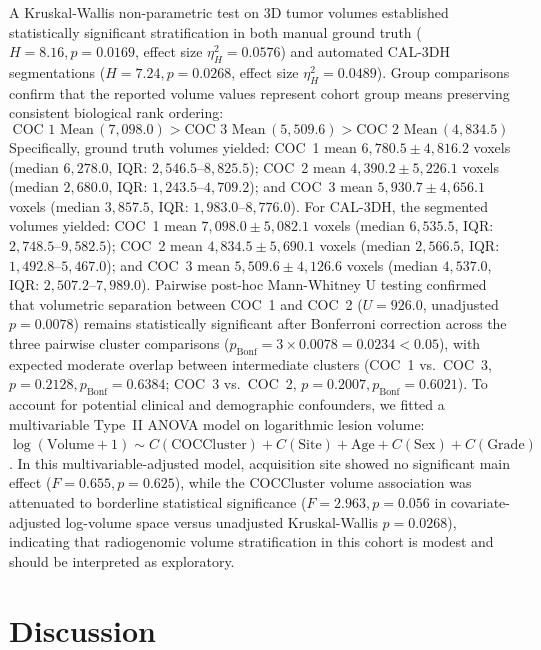 \documentclass[11pt,a4paper]{article}
\begin{document}
A Kruskal-Wallis non-parametric test on 3D tumor volumes established statistically significant stratification in both manual ground truth ($H = 8.16, p = \mathbf{0.0169}$, effect size $\eta^2_H = 0.0576$) and automated CAL-3DH segmentations ($H = 7.24, p = \mathbf{0.0268}$, effect size $\eta^2_H = 0.0489$). Group comparisons confirm that the reported volume values represent cohort group means preserving consistent biological rank ordering:
\begin{equation}
\text{COC 1 Mean}\,(7{,}098.0) > \text{COC 3 Mean}\,(5{,}509.6) > \text{COC 2 Mean}\,(4{,}834.5)
\end{equation}
Specifically, ground truth volumes yielded: COC~1 mean $6{,}780.5 \pm 4{,}816.2$ voxels (median $6{,}278.0$, IQR: $2{,}546.5$--$8{,}825.5$); COC~2 mean $4{,}390.2 \pm 5{,}226.1$ voxels (median $2{,}680.0$, IQR: $1{,}243.5$--$4{,}709.2$); and COC~3 mean $5{,}930.7 \pm 4{,}656.1$ voxels (median $3{,}857.5$, IQR: $1{,}983.0$--$8{,}776.0$). For CAL-3DH, the segmented volumes yielded: COC~1 mean $7{,}098.0 \pm 5{,}082.1$ voxels (median $6{,}535.5$, IQR: $2{,}748.5$--$9{,}582.5$); COC~2 mean $4{,}834.5 \pm 5{,}690.1$ voxels (median $2{,}566.5$, IQR: $1{,}492.8$--$5{,}467.0$); and COC~3 mean $5{,}509.6 \pm 4{,}126.6$ voxels (median $4{,}537.0$, IQR: $2{,}507.2$--$7{,}989.0$). Pairwise post-hoc Mann-Whitney U testing confirmed that volumetric separation between COC~1 and COC~2 ($U = 926.0$, unadjusted $p = 0.0078$) remains statistically significant after Bonferroni correction across the three pairwise cluster comparisons ($p_{\text{Bonf}} = 3 \times 0.0078 = 0.0234 < 0.05$), with expected moderate overlap between intermediate clusters (COC~1 vs.\ COC~3, $p = 0.2128, p_{\text{Bonf}} = 0.6384$; COC~3 vs.\ COC~2, $p = 0.2007, p_{\text{Bonf}} = 0.6021$). To account for potential clinical and demographic confounders, we fitted a multivariable Type~II ANOVA model on logarithmic lesion volume: $\log(\text{Volume}+1) \sim C(\text{COCCluster}) + C(\text{Site}) + \text{Age} + C(\text{Sex}) + C(\text{Grade})$. In this multivariable-adjusted model, acquisition site showed no significant main effect ($F = 0.655, p = 0.625$), while the COCCluster volume association was attenuated to borderline statistical significance ($F = 2.963, p = 0.056$ in covariate-adjusted log-volume space versus unadjusted Kruskal-Wallis $p = 0.0268$), indicating that radiogenomic volume stratification in this cohort is modest and should be interpreted as exploratory.

\setlength{\textfloatsep}{8pt plus 2pt minus 2pt}
\section{Discussion}
\end{document}
